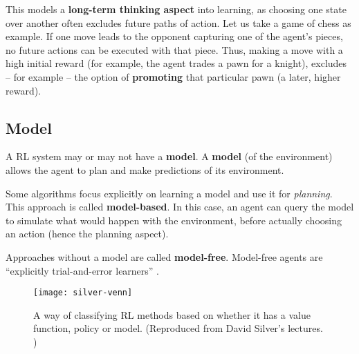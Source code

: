 This models a \textbf{long-term thinking aspect} into learning, as choosing one state over another often excludes future paths of action.
Let us take a game of chess as example.
If one move leads to the opponent capturing one of the agent's pieces, no future actions can be executed with that piece.
Thus, making a move with a high initial reward (for example, the agent trades a pawn for a knight), excludes -- for example -- the option of \textbf{promoting} that particular pawn (a later, higher reward).

\subsection{Model}
A RL system may or may not have a \textbf{model}.
A \textbf{model} (of the environment) allows the agent to plan and make predictions of its environment.

Some algorithms focus explicitly on learning a model and use it for \emph{planning}.
This approach is called \textbf{model-based}.
In this case, an agent can query the model to simulate what would happen with the environment, before actually choosing an action (hence the planning aspect).

Approaches without a model are called \textbf{model-free}.
Model-free agents are ``explicitly trial-and-error learners'' \cite{rlai}.

\begin{figure}[ht]
    \caption{A way of classifying RL methods based on whether it has a value function, policy or model. (Reproduced from David Silver's lectures. \cite{silver-lectures})}
    \vspace*{0.2cm}
    \centering
    \texttt{[image: silver-venn]}
\end{figure}
